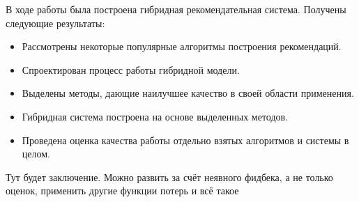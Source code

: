 \documentclass[a4paper,article,14pt]{extarticle}
\begin{document}
В ходе работы была построена гибридная рекомендательная система.
Получены следующие результаты:

\begin{itemize}
\item Рассмотрены некоторые популярные алгоритмы построения рекомендаций.
\item Спроектирован процесс работы гибридной модели.
\item Выделены методы, дающие наилучшее качество в своей области применения.
\item Гибридная система построена на основе выделенных методов.
\item Проведена оценка качества работы отдельно взятых алгоритмов и системы в целом.
\end{itemize}

\pagebreak
{}
Тут будет заключение.
Можно развить за счёт неявного фидбека, а не только оценок, применить другие функции потерь и всё такое

\pagebreak
\end{document}
